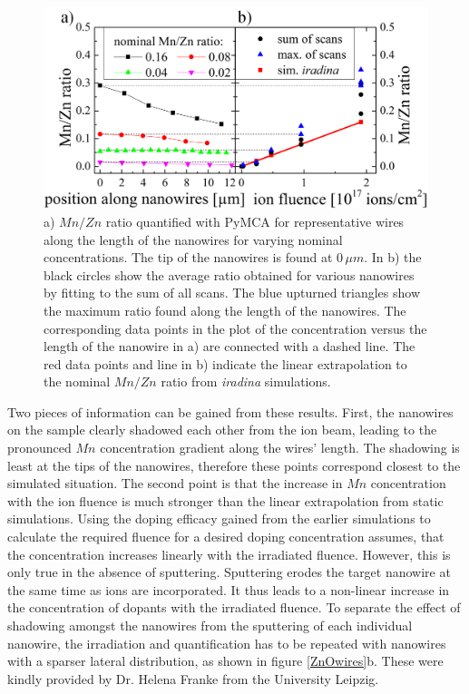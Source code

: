 \begin{figure}
	\centering
		\includegraphics[width=.8\textwidth]{images/MnZn1.png}
	\caption{a) $Mn/Zn$ ratio quantified with PyMCA for representative wires along the length of the nanowires for varying nominal concentrations. The tip of the nanowires is found at $0\,\mu m$. In b) the black circles show the average ratio obtained for various nanowires by fitting to the sum of all scans. The blue upturned triangles show the maximum ratio found along the length of the nanowires. The corresponding data points in the plot of the concentration versus the length of the nanowire in a) are connected with a dashed line. The red data points and line in b) indicate the linear extrapolation to the nominal $Mn/Zn$ ratio from \emph{iradina} simulations.}
	\label{MnZn1}
\end{figure} 
 
Two pieces of information can be gained from these results. First, the nanowires on the sample clearly shadowed each other from the ion beam, leading to the pronounced $Mn$ concentration gradient along the wires' length. The shadowing is least at the tips of the nanowires, therefore these points correspond closest to the simulated situation. The second point is that the increase in $Mn$ concentration with the ion fluence is much stronger than the linear extrapolation from static simulations. Using the doping efficacy gained from the earlier simulations to calculate the required fluence for a desired doping concentration assumes, that the concentration increases linearly with the irradiated fluence. However, this is only true in the absence of sputtering. Sputtering erodes the target nanowire at the same time as ions are incorporated. It thus leads to a non-linear increase in the concentration of dopants with the irradiated fluence. To separate the effect of shadowing amongst the nanowires from the sputtering of each individual nanowire, the irradiation and quantification has to be repeated with nanowires with a sparser lateral distribution, as shown in figure \ref{ZnOwires}b. These were kindly provided by Dr. Helena Franke from the University Leipzig.


